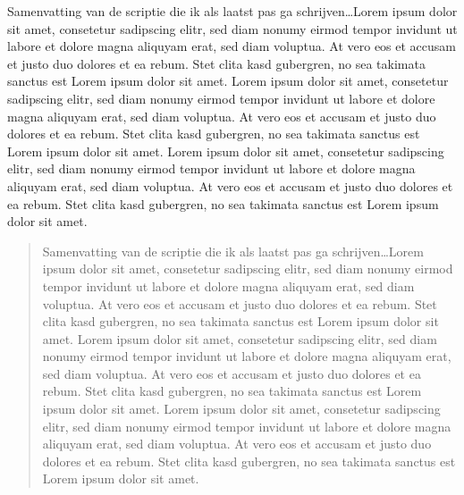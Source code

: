 \documentclass[
11pt, %
english, %
singlespacing, %
headsepline, %
]{formatting} %
\begin{document}
\begin{samenvatting}
	Samenvatting van de scriptie die ik als laatst pas ga schrijven\ldots Lorem ipsum dolor sit amet, consetetur sadipscing elitr, sed diam nonumy eirmod tempor invidunt ut labore et dolore magna aliquyam erat, sed diam voluptua. At vero eos et accusam et justo duo dolores et ea rebum. Stet clita kasd gubergren, no sea takimata sanctus est Lorem ipsum dolor sit amet. Lorem ipsum dolor sit amet, consetetur sadipscing elitr, sed diam nonumy eirmod tempor invidunt ut labore et dolore magna aliquyam erat, sed diam voluptua. At vero eos et accusam et justo duo dolores et ea rebum. Stet clita kasd gubergren, no sea takimata sanctus est Lorem ipsum dolor sit amet. Lorem ipsum dolor sit amet, consetetur sadipscing elitr, sed diam nonumy eirmod tempor invidunt ut labore et dolore magna aliquyam erat, sed diam voluptua. At vero eos et accusam et justo duo dolores et ea rebum. Stet clita kasd gubergren, no sea takimata sanctus est Lorem ipsum dolor sit amet.
\end{samenvatting}


\begin{abstract}
	Samenvatting van de scriptie die ik als laatst pas ga schrijven\ldots Lorem ipsum dolor sit amet, consetetur sadipscing elitr, sed diam nonumy eirmod tempor invidunt ut labore et dolore magna aliquyam erat, sed diam voluptua. At vero eos et accusam et justo duo dolores et ea rebum. Stet clita kasd gubergren, no sea takimata sanctus est Lorem ipsum dolor sit amet. Lorem ipsum dolor sit amet, consetetur sadipscing elitr, sed diam nonumy eirmod tempor invidunt ut labore et dolore magna aliquyam erat, sed diam voluptua. At vero eos et accusam et justo duo dolores et ea rebum. Stet clita kasd gubergren, no sea takimata sanctus est Lorem ipsum dolor sit amet. Lorem ipsum dolor sit amet, consetetur sadipscing elitr, sed diam nonumy eirmod tempor invidunt ut labore et dolore magna aliquyam erat, sed diam voluptua. At vero eos et accusam et justo duo dolores et ea rebum. Stet clita kasd gubergren, no sea takimata sanctus est Lorem ipsum dolor sit amet.
\end{abstract}


\renewcommand{\contentsname}{Inhoud}
\tableofcontents %
\end{document}

